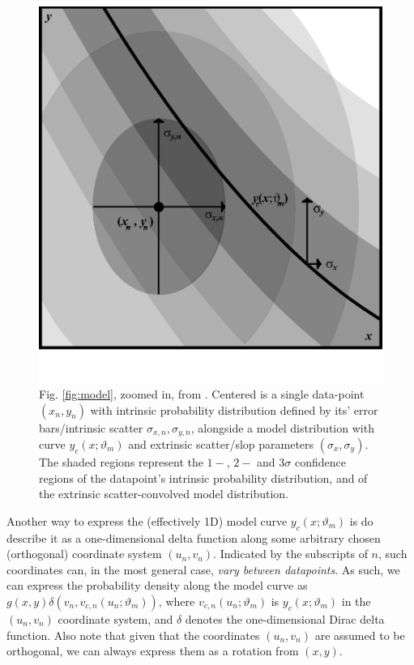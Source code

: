 \begin{figure}
    \centering
    \includegraphics[width=0.8\linewidth]{figures/model_zoomedin.eps}
    \caption{Fig. \ref{fig:model}, zoomed in, from \textcite{trotter}. Centered is a single data-point $(x_n, y_n)$ with intrinsic probability distribution defined by its' error bars/intrinsic scatter $\sigma_{x,n}, \sigma_{y,n}$, alongside a model distribution with curve $y_c(x;\vartheta_m)$ and extrinsic scatter/slop parameters $(\sigma_x,\sigma_y)$. The shaded regions represent the $1-$, $2-$ and $3\sigma$ confidence regions of the datapoint's intrinsic probability distribution, and of the extrinsic scatter-convolved model distribution.}
    \label{fig:model_zoomedin}
\end{figure}

Another way to express the (effectively 1D) model curve $y_c(x;\vartheta_m)$ is do describe it as a one-dimensional delta function along some arbitrary chosen (orthogonal) coordinate system $(u_n, v_n)$. Indicated by the subscripts of $n$, such coordinates can, in the most general case, \textit{vary between datapoints}. As such, we can express the probability density along the model curve as $g(x,y)\delta(v_n, v_{c,n}(u_n;\vartheta_m))$, where $v_{c,n}(u_n;\vartheta_m)$ is $y_c(x;\vartheta_m)$ in the $(u_n, v_n)$ coordinate system, and $\delta$ denotes the one-dimensional Dirac delta function. Also note that given that the coordinates $(u_n, v_n)$ are assumed to be orthogonal, we can always express them as a rotation from $(x,y)$.

